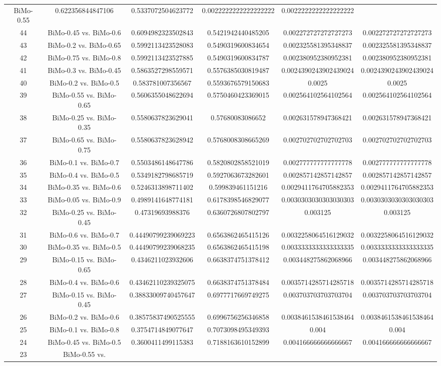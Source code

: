 \documentclass[a4paper,10pt]{article}
\begin{document}
\begin{landscape}
\begin{table}[!htp]
\begin{tabular}{cccccc}
BiMo-0.55&0.622356844847106&0.5337072504623772&0.0022222222222222222&0.0022222222222222222\\44&BiMo-0.45 vs. BiMo-0.6&0.6094982323502843&0.5421942440485205&0.002272727272727273&0.002272727272727273\\43&BiMo-0.2 vs. BiMo-0.65&0.5992113423528083&0.5490319600834654&0.002325581395348837&0.002325581395348837\\42&BiMo-0.75 vs. BiMo-0.8&0.5992113423527885&0.5490319600834787&0.002380952380952381&0.002380952380952381\\41&BiMo-0.3 vs. BiMo-0.45&0.5863527298559571&0.5576385030819487&0.0024390243902439024&0.0024390243902439024\\40&BiMo-0.2 vs. BiMo-0.5&0.583781007356567&0.5593676579150683&0.0025&0.0025\\39&BiMo-0.55 vs. BiMo-0.65&0.5606355048622694&0.5750460423369015&0.002564102564102564&0.002564102564102564\\38&BiMo-0.25 vs. BiMo-0.35&0.5580637823629041&0.57680083086652&0.002631578947368421&0.002631578947368421\\37&BiMo-0.65 vs. BiMo-0.75&0.5580637823628942&0.5768008308665269&0.002702702702702703&0.002702702702702703\\36&BiMo-0.1 vs. BiMo-0.7&0.5503486148647786&0.5820802858521019&0.002777777777777778&0.002777777777777778\\35&BiMo-0.4 vs. BiMo-0.5&0.5349182798685719&0.5927063673282601&0.002857142857142857&0.002857142857142857\\34&BiMo-0.35 vs. BiMo-0.6&0.5246313898711402&0.599839461151216&0.0029411764705882353&0.0029411764705882353\\33&BiMo-0.05 vs. BiMo-0.9&0.4989141648774181&0.6178398546829077&0.0030303030303030303&0.0030303030303030303\\32&BiMo-0.25 vs. BiMo-0.45&0.47319693988376&0.6360726807802797&0.003125&0.003125\\31&BiMo-0.6 vs. BiMo-0.7&0.44490799239069223&0.6563862465415126&0.0032258064516129032&0.0032258064516129032\\30&BiMo-0.35 vs. BiMo-0.5&0.44490799239068235&0.6563862465415198&0.0033333333333333335&0.0033333333333333335\\29&BiMo-0.15 vs. BiMo-0.65&0.4346211023932606&0.6638374751378412&0.003448275862068966&0.003448275862068966\\28&BiMo-0.4 vs. BiMo-0.6&0.43462110239325075&0.6638374751378484&0.0035714285714285718&0.0035714285714285718\\27&BiMo-0.15 vs. BiMo-0.45&0.38833009740457647&0.6977717669749275&0.003703703703703704&0.003703703703703704\\26&BiMo-0.2 vs. BiMo-0.6&0.38575837490525555&0.6996756256346858&0.0038461538461538464&0.0038461538461538464\\25&BiMo-0.1 vs. BiMo-0.8&0.3754714849077647&0.7073098495349393&0.004&0.004\\24&BiMo-0.45 vs. BiMo-0.5&0.3600411499115383&0.7188163610152899&0.004166666666666667&0.004166666666666667\\23&BiMo-0.55 vs. 
\end{tabular}
\end{table}
\end{landscape}
\end{document}
